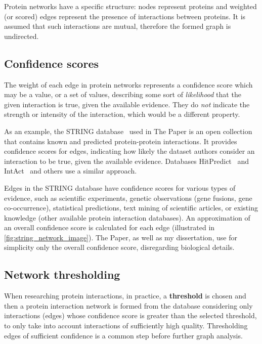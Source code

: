 Protein networks have a specific structure: nodes represent proteins and weighted (or scored) edges represent the presence of interactions between proteins.
It is assumed that such interactions are mutual, therefore the formed graph is undirected.



\subsection{Confidence scores}

The weight of each edge in protein networks represents a confidence score which may be a value, or a set of values, describing some sort of \textsl{likelihood} that the given interaction is true, given the available evidence.
They do \textsl{not} indicate the strength or intensity of the interaction, which would be a different property.

As an example, the STRING database~\cite{Szklarczyk2019} used in The Paper is an open collection that contains known and predicted protein-protein interactions.
It provides confidence scores for edges, indicating how likely the dataset authors consider an interaction to be true, given the available evidence.
Databases HitPredict~\cite{LopezHitPredictVersionComprehensive2015} and IntAct~\cite{OrchardMIntActProjectIntAct2014} and others use a similar approach.



Edges in the STRING database have confidence scores for various types of evidence, such as scientific experiments, genetic observations (gene fusions, gene co-occurrence), statistical predictions, text mining of scientific articles, or existing knowledge (other available protein interaction databases).
An approximation of an overall confidence score is calculated for each edge (illustrated in \autoref{fig:string_network_image}).
The Paper, as well as my dissertation, use for simplicity only the overall confidence score, disregarding biological details.

\subsection{Network thresholding}

When researching protein interactions, in practice, a \textbf{threshold} is chosen and then a protein interaction network is formed from the database considering only interactions (edges) whose confidence score is greater than the selected threshold, to only take into account interactions of sufficiently high quality.
Thresholding edges of sufficient confidence is a common step before further graph analysis.

